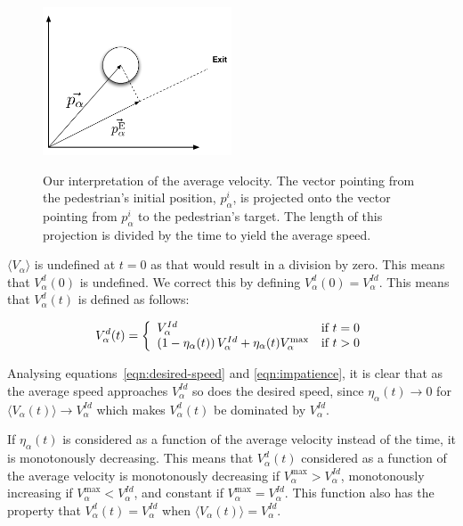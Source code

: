 \begin{figure}[ht]
    \centering
    {\includegraphics[width=0.5\textwidth]{Figures/NotationOfPedestrian2.pdf}} 
    \caption[Our interpretation of the average velocity]{Our interpretation of 
    the average velocity. The vector pointing from the pedestrian's initial 
    position, $p^i_\alpha$, is projected onto the vector pointing from 
    $p^i_\alpha$ to the pedestrian's target. The length of this projection is 
    divided by the time to yield the average speed.}
    \label{impatience}
\end{figure}

$\langle V_{\alpha}\rangle$ is undefined at $t=0$ as that would result in a 
division by zero. This means that $V^d_\alpha(0)$ is undefined. We correct 
this by defining $V^d_\alpha(0)=V^{Id}_\alpha$. This means that $V^d_\alpha(t)$ 
is defined as follows:

\begin{equation}\label{eqn:cond-define}
    V_{\alpha}^{d} (t) = \left\{ 
    \begin{array}{l l}
        V_\alpha^{Id} & \text{if $t=0$}\\
        \left( 1 - \eta_{\alpha}(t) \right) 
        V^{Id}_{\alpha} +
        \eta_{\alpha}(t) V_{\alpha}^{\text{max}}
        & \text{if $t > 0$}\\
    \end{array} \right.
\end{equation}

Analysing equations~\eqref{eqn:desired-speed} and \eqref{eqn:impatience}, it 
is clear that as the average speed approaches $V^{Id}_\alpha$ so does the 
desired speed, since $\eta_\alpha(t)\rightarrow0$ for $\langle V_\alpha(t) 
\rangle \rightarrow V^{Id}_\alpha$ which makes $V^d_\alpha(t)$ be dominated by 
$V^{Id}_\alpha$.  


If $\eta_\alpha(t)$ is considered as a function of the average velocity 
instead of the time, it is monotonously decreasing. This means that 
$V^d_\alpha(t)$ considered as a function of the average velocity is 
monotonously decreasing if $V^{\text{max}}_\alpha > V^{Id}_\alpha$, 
monotonously increasing if $V^{\text{max}}_\alpha < V^{Id}_\alpha$, and 
constant if $V^{\text{max}}_\alpha = V^{Id}_\alpha$. This function also has 
the property that $V^d_\alpha(t)=V^{Id}_\alpha$ when $\langle V_\alpha(t) 
\rangle = V^{Id}_\alpha$.

